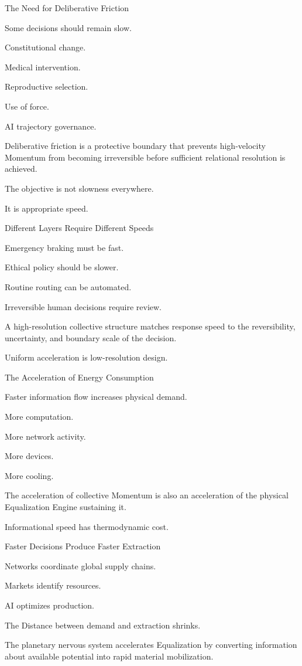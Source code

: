 The Need for Deliberative Friction

Some decisions should remain slow.

Constitutional change.

Medical intervention.

Reproductive selection.

Use of force.

AI trajectory governance.

Deliberative friction is a protective boundary that prevents high-velocity Momentum from becoming irreversible before sufficient relational resolution is achieved.

The objective is not slowness everywhere.

It is appropriate speed.

Different Layers Require Different Speeds

Emergency braking must be fast.

Ethical policy should be slower.

Routine routing can be automated.

Irreversible human decisions require review.

A high-resolution collective structure matches response speed to the reversibility, uncertainty, and boundary scale of the decision.

Uniform acceleration is low-resolution design.

The Acceleration of Energy Consumption

Faster information flow increases physical demand.

More computation.

More network activity.

More devices.

More cooling.

The acceleration of collective Momentum is also an acceleration of the physical Equalization Engine sustaining it.

Informational speed has thermodynamic cost.

Faster Decisions Produce Faster Extraction

Networks coordinate global supply chains.

Markets identify resources.

AI optimizes production.

The Distance between demand and extraction shrinks.

The planetary nervous system accelerates Equalization by converting information about available potential into rapid material mobilization.

